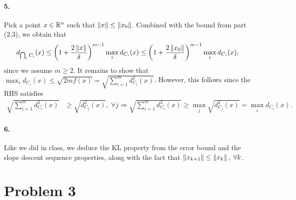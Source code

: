 \documentclass[10pt]{article}
\begin{document}
\paragraph{5.}
Pick a point $x \in \mathbb{R}^n$ such that $\left \| x \right \| \leq \left \| x_0 \right \|$. Combined with
the bound from part (2.3), we obtain that
\[
    d_{\operatorname*{\bigcap}_i C_i}(x) \leq \left(1 + \frac{2 \left \| x \right \|}{\delta}\right)^{m-1}
    \max_i d_{C_i}(x) \leq \left(1 + \frac{2 \left \| x_0 \right \|}{\delta}\right)^{m-1}
    \max_i d_{C_i}(x),
\]
since we assume $m \geq 2$. It remains to show that $\max_i d_{C_i}(x) \leq
\sqrt{2 m f(x)} = \sqrt{\sum_{i=1}^m d_{C_i}^2(x)}$. However, this follows
since the RHS satisfies
\begin{align*}
    \sqrt{\sum_{i=1}^m d_{C_i}^2(x)} &\geq \sqrt{d_{C_j}^2(x)}, \; \forall j
    \Rightarrow \sqrt{\sum_{i=1}^m d_{C_i}^2(x)} \geq \max_j \sqrt{d_{C_j}^2(x)}
    = \max_i d_{C_i}(x).
\end{align*}

\paragraph{6.}
Like we did in class, we deduce the KL property from the error bound and the
slope descent sequence properties, along with the fact that $\left \| x_{k+1} \right \|
\leq \left \| x_{k} \right \|, \; \forall k$.
\section*{Problem 3}
\end{document}
